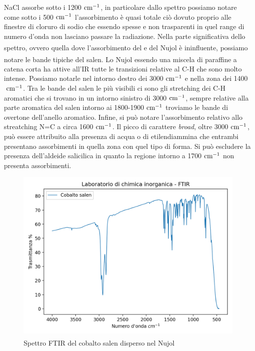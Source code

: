 NaCl assorbe sotto i 1200$\mathrm{\ cm^{-1}}$, in particolare dallo spettro possiamo notare come sotto i 500$\mathrm{\ cm^{-1}}$ l'assorbimento è quasi totale ciò dovuto proprio alle finestre di cloruro di sodio che essendo spesse e non trasparenti in quel range di numero d'onda non lasciano passare la radiazione. Nella parte significativa dello spettro, ovvero quella dove l'assorbimento del  e del Nujol\textsuperscript{\tiny\textregistered} è ininfluente, possiamo notare le bande tipiche del salen. Lo Nujol\textsuperscript{\tiny\textregistered} essendo una miscela di paraffine a catena corta ha attive all'IR tutte le transizioni relative al C-H che sono molto intense. Possiamo notarle nel intorno destro dei 3000$\mathrm{\ cm^{-1}}$ e nella zona dei 1400$\mathrm{\ cm^{-1}}$. Tra le bande del salen le più visibili ci sono gli stretching dei C-H aromatici che si trovano in un intorno sinistro di  3000$\mathrm{\ cm^{-1}}$, sempre relative alla parte aromatica del salen intorno ai 1800-1900$\mathrm{\ cm^{-1}}$ troviamo le bande di overtone dell'anello aromatico. Infine, si può notare l'assorbimento relativo allo streatching N=C a circa 1600$\mathrm{\ cm^{-1}}$.
Il picco di carattere \textit{broad}, oltre 3000$\mathrm{\ cm^{-1}}$, può essere attribuito alla presenza di acqua o di etilendiammina che entrambi presentano assorbimenti in quella zona con quel tipo di forma. Si può escludere la presenza dell’aldeide salicilica in quanto la regione intorno a 1700$\mathrm{\ cm^{-1}}$ non presenta assorbimenti.
\begin{figure}[ht!]
    \centering
    \includegraphics[width=\linewidth]{Relazione/foto/FTIRsalen.png}
    \caption{Spettro FTIR del cobalto salen disperso nel Nujol\textsuperscript{\tiny\textregistered}}
    \label{fig:FTIRsalen}
\end{figure}
